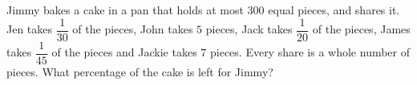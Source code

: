 Jimmy bakes a cake in a pan that holds at most $300$ equal pieces, and shares it. Jen takes $\dfrac1{30}$ of the pieces, John takes $5$ pieces, Jack takes $\dfrac1{20}$ of the pieces, James takes $\dfrac1{45}$ of the pieces and Jackie takes $7$ pieces. Every share is a whole number of pieces. What percentage of the cake is left for Jimmy?
